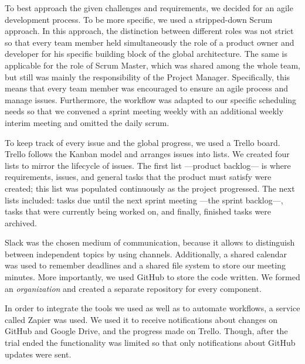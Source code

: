 To best approach the given challenges and requirements, we decided for
an agile development process. To be more specific, we used a
stripped-down Scrum approach. In this approach, the distinction between
different roles was not strict so that every team member held
simultaneously the role of a product owner and developer for his
specific building block of the global architecture. The same is
applicable for the role of Scrum Master, which was shared among the
whole team, but still was mainly the responsibility of the Project
Manager. Specifically, this means that every team member was encouraged
to ensure an agile process and manage issues. Furthermore, the
workflow was adapted to our specific scheduling needs so that we convened a
sprint meeting weekly with an additional weekly interim meeting and
omitted the daily scrum.

To keep track of every issue and the global progress, we used a Trello board.
Trello follows the Kanban model and arranges issues into lists. We created
four lists to mirror the lifecycle of issues. The first list ---product
backlog--- is where requirements, issues, and general tasks that the product
must satisfy were created; this list was populated continuously as the project
progressed. The next lists included: tasks due until the next sprint meeting
---the sprint backlog---, tasks that were currently being worked on,
and finally, finished tasks were archived.

Slack was the chosen medium of communication, because it allows to
distinguish between independent topics by using channels. Additionally,
a shared calendar was used to remember deadlines and a shared file
system to store our meeting minutes. More importantly, we used
GitHub to store the code written. We formed an \emph{organization} and created
a separate repository for every component.

In order to integrate the tools we used as well as to automate
workflows, a service called Zapier was used. We used it to receive
notifications about changes on GitHub and Google Drive, and the progress
made on Trello. Though, after the trial ended the functionality was
limited so that only notifications about GitHub updates were sent.

